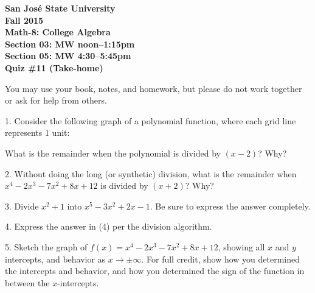 \documentclass[letterpaper, 12pt]{article}
\begin{document}
\begin{center}
\bfseries
San Jos\'{e} State University \\
Fall 2015 \\
Math-8: College Algebra \\
Section 03: MW noon--1:15pm \\
Section 05: MW 4:30--5:45pm \\
\bigskip
Quiz \#11 (Take-home)
\end{center}

\bigskip

You may use your book, notes, and homework, but please do not work together or
ask for help from others.

\bigskip

\newcommand{\fillin}{\rule{1.5in}{1pt}}

1. Consider the following graph of a polynomial function, where each grid line
represents 1 unit:

\bigskip

\begin{center}
\end{center}

\bigskip

What is the remainder when the polynomial is divided by $(x-2)$? Why?

\vspace{1in}

2. Without doing the long (or synthetic) division, what is the remainder when
$x^4-2x^3-7x^2+8x+12$ is divided by $(x+2)$? Why?

\newpage

3. Divide $x^2+1$ into $x^5-3x^2+2x-1$. Be sure to express the answer
completely.

\vspace{5in}

4. Express the answer in (4) per the division algorithm.

\newpage

5. Sketch the graph of $f(x)=x^4-2x^3-7x^2+8x+12$, showing all $x$ and $y$
intercepts, and behavior as $x\to\pm\infty$. For full credit, show how you
determined the intercepts and behavior, and how you determined the sign of
the function in between the $x$-intercepts.

\vspace{3in}
\end{document}
